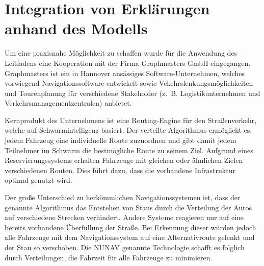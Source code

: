 \section{Integration von Erklärungen anhand des Modells}

Um eine praxisnahe Möglichkeit zu schaffen wurde für die Anwendung des Leitfadens eine Kooperation mit der Firma Graphmasters GmbH eingegangen. Graphmasters ist ein in Hannover ansässiges Software-Unternehmen, welches vorwiegend Navigationssoftware entwickelt sowie Vekehrslenkungsmöglichkeiten und Tourenplanung für verschiedene Stakeholder (z.~B. Logistikunternehmen und Verkehrsmanagementzentralen) anbietet. 

Kernprodukt des Unternehmens ist eine Routing-Engine für den Straßenverkehr, welche auf Schwarmintelligenz basiert. Der verteilte Algorithmus ermöglicht es, jedem Fahrzeug eine individuelle Route zuzuordnen und gibt damit jedem Teilnehmer im Schwarm die bestmögliche Route zu seinem Ziel. Aufgrund eines Reservierungssystems erhalten Fahrzeuge mit gleichen oder ähnlichen Zielen verschiedenen Routen. Dies führt dazu, dass die vorhandene Infrastruktur optimal genutzt wird.

Der große Unterschied zu herkömmlichen Navigationssystemen ist, dass der genannte Algorithmus das Entstehen von Staus durch die Verteilung der Autos auf verschiedene Strecken verhindert. Andere Systeme reagieren nur auf eine bereits vorhandene Überfüllung der Straße. Bei Erkennung dieser würden jedoch alle Fahrzeuge mit dem Navigationssystem auf eine Alternativroute gelenkt und der Stau so verschoben. Die \glqq NUNAV\grqq{} genannte Technologie schaﬀt es folglich durch Verteilungen, die Fahrzeit für alle Fahrzeuge zu minimieren.









